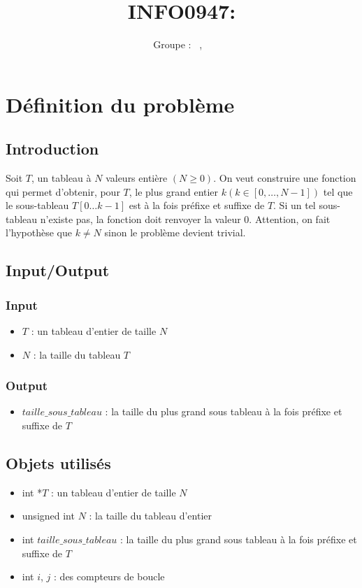 \documentclass[a4paper, 11pt, oneside]{article}
\title{INFO0947: \intitule}
\author{Groupe \GrNbr : \PrenomUN~\textsc{\NomUN}, \PrenomDEUX~\textsc{\NomDEUX}}
\date{}
\newcommand{\tablemat}{~}
\renewcommand{\tablemat}{\tableofcontents}
\begin{document}
\maketitle
\newpage
\tablemat
\newpage


\section{Définition du problème}
\subsection{Introduction}
Soit $T$, un tableau à $N$ valeurs entière $(N \geq 0)$. On veut
construire une fonction qui permet d’obtenir, pour $T$, le plus 
grand entier $k (k\in [0,\dots,N-1])$ tel que le sous-tableau 
$T[0\dots k-1]$ est à la fois préfixe et suffixe de $T$. 
Si un tel sous-tableau n’existe pas, la fonction doit renvoyer la 
valeur 0. Attention, on fait l’hypothèse que $k\neq N$ sinon 
le problème devient trivial.
\subsection{Input/Output}
\subsubsection{Input}
\begin{itemize}
  \item $T$ : un tableau d'entier de taille $N$
  \item $N$ : la taille du tableau $T$
\end{itemize}

\subsubsection{Output}
\begin{itemize}
  \item $taille\_sous\_tableau$ : la taille du plus grand sous tableau à la fois préfixe et suffixe de $T$
\end{itemize}

\subsection{Objets utilisés}
\begin{itemize}
  \item int *$T$ : un tableau d'entier de taille $N$
  \item unsigned int $N$ : la taille du tableau d'entier
  \item int $taille\_sous\_tableau$ : la taille du plus grand sous tableau à la fois préfixe et suffixe de $T$
  \item int $i$, $j$ : des compteurs de boucle
\end{itemize}
\end{document}
